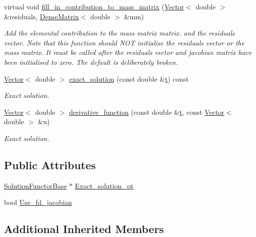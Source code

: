 \begin{DoxyCompactItemize}
virtual void \hyperlink{classoomph_1_1ODEElement_aef001ba04ec222921cbdf887ddc6b041}{fill\+\_\+in\+\_\+contribution\+\_\+to\+\_\+mass\+\_\+matrix} (\hyperlink{classoomph_1_1Vector}{Vector}$<$ double $>$ \&residuals, \hyperlink{classoomph_1_1DenseMatrix}{Dense\+Matrix}$<$ double $>$ \&mm)
\begin{DoxyCompactList}\small\item\em Add the elemental contribution to the mass matrix matrix. and the residuals vector. Note that this function should N\+OT initialise the residuals vector or the mass matrix. It must be called after the residuals vector and jacobian matrix have been initialised to zero. The default is deliberately broken. \end{DoxyCompactList}\item 
\hyperlink{classoomph_1_1Vector}{Vector}$<$ double $>$ \hyperlink{classoomph_1_1ODEElement_a4d5e0a3989f17428bbc9e8eca4470fe2}{exact\+\_\+solution} (const double \&\hyperlink{cfortran_8h_af6f0bd3dc13317f895c91323c25c2b8f}{t}) const
\begin{DoxyCompactList}\small\item\em Exact solution. \end{DoxyCompactList}\item 
\hyperlink{classoomph_1_1Vector}{Vector}$<$ double $>$ \hyperlink{classoomph_1_1ODEElement_a95369a0392e9e068ad2a85b78ba0cbb3}{derivative\+\_\+function} (const double \&\hyperlink{cfortran_8h_af6f0bd3dc13317f895c91323c25c2b8f}{t}, const \hyperlink{classoomph_1_1Vector}{Vector}$<$ double $>$ \&u)
\begin{DoxyCompactList}\small\item\em Exact solution. \end{DoxyCompactList}\end{DoxyCompactItemize}
\subsection*{Public Attributes}
\begin{DoxyCompactItemize}
\item 
\hyperlink{classoomph_1_1SolutionFunctorBase}{Solution\+Functor\+Base} $\ast$ \hyperlink{classoomph_1_1ODEElement_a57144f54edb040be5d139d2768fcd396}{Exact\+\_\+solution\+\_\+pt}
\item 
bool \hyperlink{classoomph_1_1ODEElement_a4d1119b79288a81c14cd7b462ca5eee6}{Use\+\_\+fd\+\_\+jacobian}
\end{DoxyCompactItemize}
\subsection*{Additional Inherited Members}



